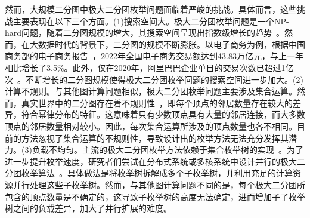 
然而，大规模二分图中极大二分团枚举问题面临着严峻的挑战。具体而言，这些挑战主要表现在以下三个方面。(1)搜索空间大。极大二分团枚举问题是一个NP-hard问题，随着二分图规模的增大，其搜索空间呈现出指数级增长的趋势~\cite{MICA04}。然而，在大数据时代的背景下，二分图的规模不断膨胀。以电子商务为例，根据中国商务部的电子商务报告~\cite{ECommerceReport}，2022年全国电子商务交易额达到43.83万亿元，与上一年相比增长了3.5\%。此外，仅在2020年，阿里巴巴企业单日的交易次数已超过1亿次~\cite{MEB20}。不断增长的二分图规模使得极大二分团枚举问题的搜索空间进一步加大。(2)计算不规则。与其他图计算问题相似，极大二分团枚举问题主要涉及集合运算。然而，真实世界中的二分图存在着不规则性~\cite{Irregularity12}，即每个顶点的邻居数量存在较大的差异，符合幂律分布的特征。这意味着只有少数顶点具有大量的邻居连接，而大多数顶点的邻居数量相对较小。因此，每次集合运算所涉及的顶点数量也各不相同。目前的方法忽视了集合运算的不规则性，导致设计出的枚举方法无法充分发挥其潜力。(3)负载不均匀。主流的极大二分团枚举方法依赖于集合枚举树的实现~\cite{minel06,iMBEA14,PMBE20,ooMBE22}。为了进一步提升枚举速度，研究者们尝试在分布式系统或多核系统中设计并行的极大二分团枚举算法~\cite{mapreduceMBE16,parMBE18}。具体做法是将枚举树拆解成多个子枚举树，并利用充足的计算资源并行处理这些子枚举树。然而，与其他图计算问题不同的是，每个极大二分团所包含的顶点数量是不确定的，这导致子枚举树的高度无法确定，进而增加子了枚举树之间的负载差异，加大了并行扩展的难度。




